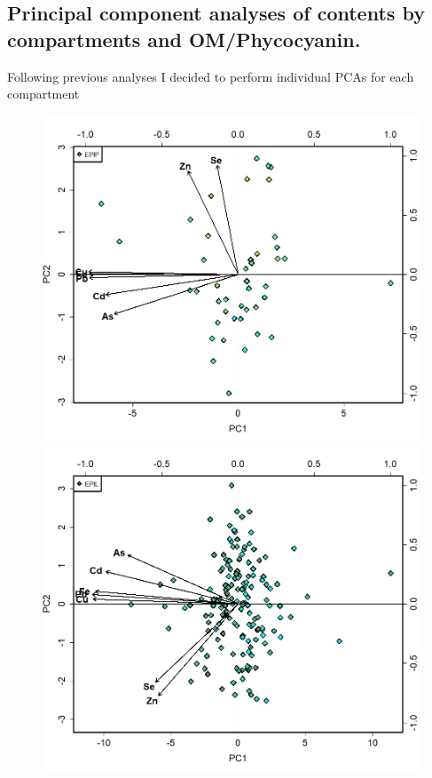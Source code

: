 \documentclass[
]{article}
\begin{document}
\FloatBarrier

\hypertarget{principal-component-analyses-of-contents-by-compartments-and-omphycocyanin.}{%
\subsection{Principal component analyses of contents by compartments and
OM/Phycocyanin.}\label{principal-component-analyses-of-contents-by-compartments-and-omphycocyanin.}}

Following previous analyses I decided to perform individual PCAs for
each compartment

\begin{figure}

{\centering \includegraphics[width=1\linewidth,height=0.2\textheight]{Figures/PCA_4_BIG5PLUS_EPIP_PHYCO} 
\FloatBarrier
\includegraphics[width=1\linewidth,height=0.2\textheight]{Figures/PCA_4_BIG5PLUS_EPIL_PHYCO} 

}
\end{figure}
\end{document}
